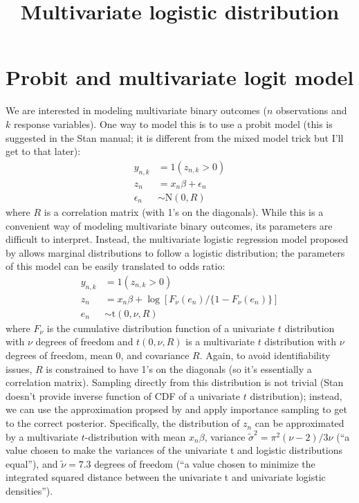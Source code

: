 \documentclass{article}\usepackage[]{graphicx}\usepackage[]{color}
\title{Multivariate logistic distribution}
\begin{document}
\maketitle

\section{Probit and multivariate logit model}

We are interested in modeling multivariate binary outcomes ($n$ observations and $k$ response variables). 
One way to model this is to use a probit model (this is suggested in the Stan manual; it is different from the mixed model trick but I'll get to that later):
\begin{equation}
\begin{aligned}
y_{n,k} &= 1(z_{n,k} > 0)\\
z_{n} &= x_n \beta + \epsilon_{n}\\
\epsilon_{n} &\sim \mathrm{N}(0, R)
\end{aligned}
\end{equation}
where $R$ is a correlation matrix (with 1's on the diagonals).
While this is a convenient way of modeling multivariate binary outcomes, its parameters are difficult to interpret. Instead, the multivariate logistic regression model proposed by \cite{o2004bayesian} allows marginal distributions to follow a logistic distribution; the parameters of this model can be easily translated to odds ratio:
\begin{equation}
\begin{aligned}
y_{n,k} &= 1(z_{n,k} > 0)\\
z_{n} &= x_n \beta + \log[F_\nu(e_n)/\{1 - F_\nu(e_n)\}]\\
e_n &\sim \mathrm{t}(0, \nu, R)
\end{aligned}
\end{equation}
where $F_\nu$ is the cumulative distribution function of a univariate $t$ distribution with $\nu$ degrees of freedom and $t(0, \nu, R)$ is a multivariate $t$ distribution with $\nu$ degrees of freedom, mean 0, and covariance $R$.
Again, to avoid identifiability issues, $R$ is constrained to have 1's on the diagonals (so it's essentially a correlation matrix).
Sampling directly from this distribution is not trivial (Stan doesn't provide inverse function of CDF of a univariate $t$ distribution); instead, we can use the approximation propsed by \cite{o2004bayesian} and apply importance sampling to get to the correct posterior. 
Specifically, the distribution of $z_n$ can be approximated by a multivariate $t$-distribution with mean $x_n\beta$, variance $\tilde \sigma^2 = \pi^2 (\nu - 2)/3 \nu$ (``a value chosen to make the variances of the univariate t and logistic distributions equal''), and $\tilde \nu = 7.3$ degrees of freedom (``a value chosen to minimize the integrated squared distance between the univariate t and univariate logistic densities'').
\end{document}
